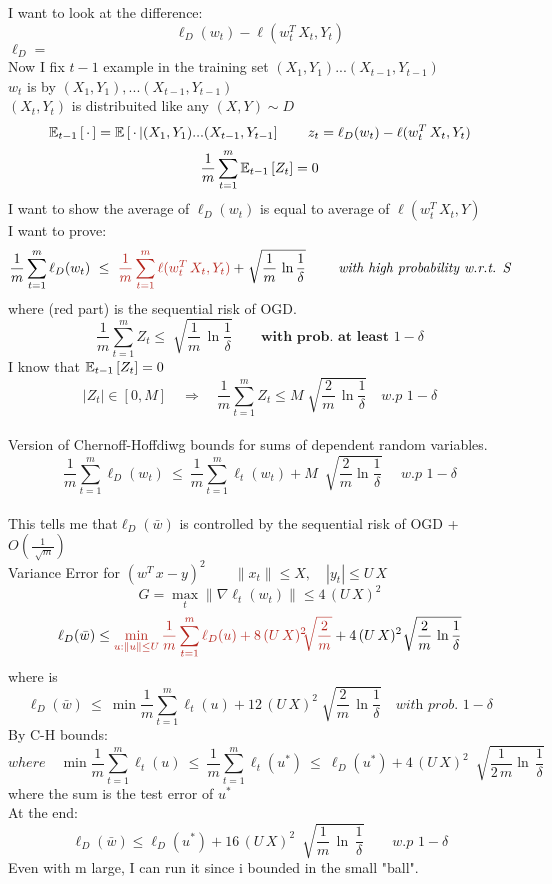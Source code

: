 \documentclass[../main.tex]{subfiles}
\begin{document}
I want to look at the difference:
$$
\ell_D(w_t) - \ell(w_t^T \, X_t, Y_t)
$$
$
\ell_D = \ $$
$\\
Now I fix $t-1$ example in the training set \quad $(X_1, Y_1) ...(X_{t-1},Y_{t-1})$
\\
$w_t$ is  by $(X_1, Y_1),...(X_{t-1},Y_{t-1})$\\
$(X_t,Y_t)$ is  distribuited like any $(X,Y) \sim D$
$$
\mathbb{E}_{t-1} \left[ \, \cdot \, \right] = \mathbb{E} \left[ \, \cdot \, | (X_1,Y_1)...(X_{t-1}, Y_{t-1} \right] \qquad z_t = \ell_D(w_t) - \ell( w_t^T \, X_t, Y_t)
$$
$$
\frac{1}{m} \sum_{t=1}^m \mathbb{E}_{t-1} \left[ Z_t \right] = 0
$$
I want to show the average of $\ell_D(w_t)$ is equal to average of $\ell(w^T_t \, X_t, Y)$
\\
I want to prove:
$$
\frac{1}{m} \sum_{t=1}^m \ell_D (w_t) \ \leq \ \red{\frac{1}{m} \sum_{t=1}^m \ell(w_t^T \, X_t, Y_t)}+ \ \sqrt[]{\frac{1}{m} \, \ln \frac{1}{\delta}} \qquad \textit{ with high probability w.r.t. S}
$$
where (red part) is the sequential risk of OGD.
$$
\frac{1}{m} \sum_{t=1}^m Z_t \leq \sqrt[]{\frac{1}{m} \, \ln \frac{1}{\delta}} \qquad \textbf{with prob. at least $1-\delta$}
$$
I know that $\mathbb{E}_{t-1} \left[ Z_t\right] = 0 $
$$ |Z_t| \in [0, M] \quad \Rightarrow \quad \frac{1}{m} \sum_{t=1}^m Z_t \leq M \sqrt[]{\frac{2}{m} \, \ln \frac{1}{\delta}} \quad \textit{w.p $1-\delta$}
$$\\
Version of Chernoff-Hoffdiwg bounds for sums of dependent random variables.
\\
$$
\frac{1}{m} \sum_{t=1}^m \ell_D(w_t) \ \leq \ \frac{1}{m} \sum_{t=1}^m \ell_t(w_t) + M \ \sqrt[]{\frac{2}{m} \ln \frac{1}{\delta}} \quad  \textit{ w.p $1-\delta$}
$$
\\
This tells me that$ \ell_D(\bar{w})$ is controlled by the sequential risk of OGD + $O \left(\frac{1}{\sqrt[]{m}} \right)$
\\
Variance Error for $(w^T \, x-y)^2 \qquad \| x_t\| \leq X, \quad |y_t| \leq U \, X$
$$
G = \max_t \| \nabla \ell_t (w_t) \| \leq 4\, (U \, X)^2
$$
$$
\ell_D(\bar{w}) \leq \red{ \min_{u: \|u\| \leq U} \frac{1}{m} \sum_{t=1}^m \ell_D(u) + 8 \, (U \, X)^2 \sqrt[]{\frac{2}{m}}}+ 4 \, (U \, X)^2 \ \sqrt[]{\frac{2}{m} \, \ln\frac{1}{\delta}}
$$
where  is 
$$
\ell_D(\bar{w}) \ \leq \ \min \frac{1}{m} \sum_{t=1}^m \ell_t(u) + 12 \, (U \, X)^2 \sqrt[]{\frac{2}{m} \, \ln \frac{1}{\delta}} \quad \textit{with prob. $1-\delta$}
$$
By C-H bounds: 
$$
where \quad \min \frac{1}{m} \sum_{t=1}^m \ell_t(u) \ \leq \ \frac{1}{m} \sum_{t=1}^m \ell_t(u^*) \ \leq \ \ell_D(u^*) + 4\, (U \, X)^2  \ \sqrt[]{\frac{1}{2 \, m} \ln \, \frac{1}{\delta}}
$$
where the sum is the test error of $u^*$
\\
At the end:
$$
\ell_D(\bar{w}) \leq \ell_D(u^*) + 16 \, (U \, X)^2 \ \sqrt[]{\frac{1}{m} \, \ln \, \frac{1}{\delta}} \qquad \textit{w.p $1-\delta$}
$$
Even with m large, I can run it since i bounded in the small "ball".
\end{document}

